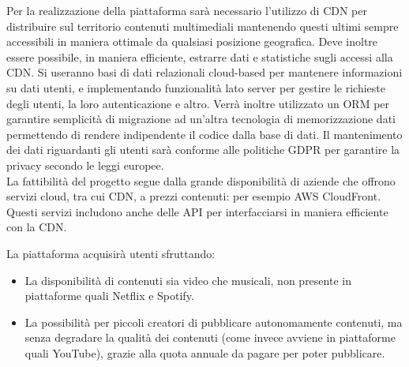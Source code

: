 Per la realizzazione della piattaforma sarà necessario l'utilizzo di CDN per distribuire sul territorio contenuti multimediali mantenendo questi ultimi sempre accessibili in maniera ottimale da qualsiasi posizione geografica. Deve inoltre essere possibile, in maniera efficiente, estrarre dati e statistiche sugli accessi alla CDN. Si useranno basi di dati relazionali cloud-based per mantenere informazioni su dati utenti, e implementando funzionalità lato server per gestire le richieste degli utenti, la loro autenticazione e altro. Verrà inoltre utilizzato un ORM per garantire semplicità di migrazione ad un'altra tecnologia di memorizzazione dati permettendo di rendere indipendente il codice dalla base di dati.
Il mantenimento dei dati riguardanti gli utenti sarà conforme alle politiche GDPR per garantire la privacy secondo le leggi europee.\\

La fattibilità del progetto segue dalla grande disponibilità di aziende che offrono servizi cloud, tra cui CDN, a prezzi contenuti: per esempio AWS CloudFront. Questi servizi includono anche delle API per interfacciarsi in maniera efficiente con la CDN.

La piattaforma acquisirà utenti sfruttando:
    \begin{itemize}
        \item La disponibilità di contenuti sia video che musicali, non presente in piattaforme quali Netflix e Spotify.
        \item La possibilità per piccoli creatori di pubblicare autonomamente contenuti, ma senza degradare la qualità dei contenuti (come invece avviene in piattaforme quali YouTube), grazie alla quota annuale da pagare per poter pubblicare.
    \end{itemize}